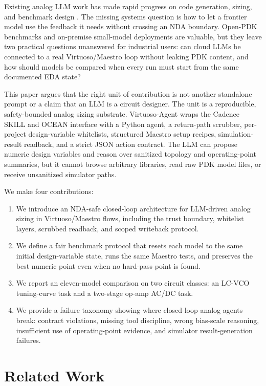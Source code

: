 \documentclass[acmsmall,review,anonymous]{acmart}
\newcommand{\framework}{Virtuoso-Agent}
\begin{document}
Existing analog LLM work has made rapid progress on code generation, sizing,
and benchmark design \cite{analogcoder,adollm,eesizer,anaflow,ledro,autosizer,
analogsage,analoggym}. The missing systems question is how to let a frontier
model use the feedback it needs without crossing an NDA boundary. Open-PDK
benchmarks and on-premise small-model deployments are valuable, but they leave
two practical questions unanswered for industrial users: can cloud LLMs be
connected to a real Virtuoso/Maestro loop without leaking PDK content, and how
should models be compared when every run must start from the same documented
EDA state?

This paper argues that the right unit of contribution is not another
standalone prompt or a claim that an LLM is a circuit designer. The unit is a
reproducible, safety-bounded analog sizing substrate. \framework{} wraps the
Cadence SKILL and OCEAN interface with a Python agent, a return-path scrubber,
per-project design-variable whitelists, structured Maestro setup recipes,
simulation-result readback, and a strict JSON action contract. The LLM can
propose numeric design variables and reason over sanitized topology and
operating-point summaries, but it cannot browse arbitrary libraries, read raw
PDK model files, or receive unsanitized simulator paths.

We make four contributions:
\begin{enumerate}
  \item We introduce an NDA-safe closed-loop architecture for LLM-driven analog
  sizing in Virtuoso/Maestro flows, including the trust boundary, whitelist
  layers, scrubbed readback, and scoped writeback protocol.
  \item We define a fair benchmark protocol that resets each model to the same
  initial design-variable state, runs the same Maestro tests, and preserves
  the best numeric point even when no hard-pass point is found.
  \item We report an eleven-model comparison on two circuit classes: an LC-VCO
  tuning-curve task and a two-stage op-amp AC/DC task.
  \item We provide a failure taxonomy showing where closed-loop analog agents
  break: contract violations, missing tool discipline, wrong bias-scale
  reasoning, insufficient use of operating-point evidence, and simulator
  result-generation failures.
\end{enumerate}

\section{Related Work}
\label{sec:related}
\end{document}
